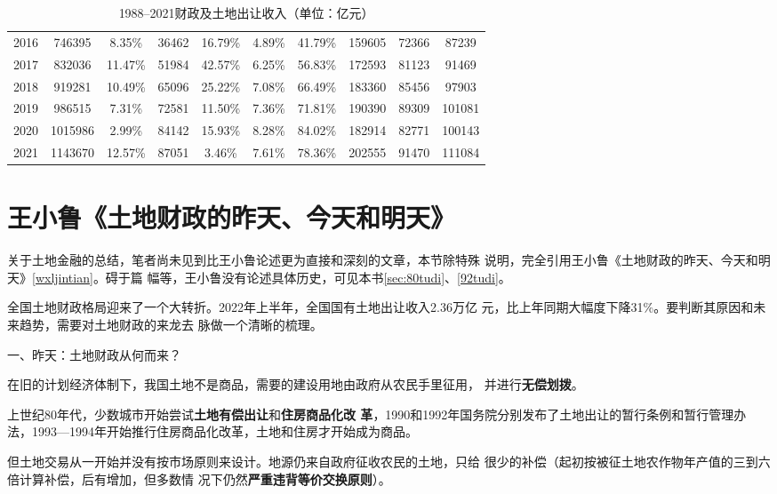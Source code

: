 \begin{table}[h]
{\begin{tabular}{@{}cccccccccc@{}}
2016 & 746395  & 8.35\%  & 36462 & 16.79\%   & 4.89\% & 41.79\% & 159605 & 72366 & 87239  \\
2017 & 832036  & 11.47\% & 51984 & 42.57\%   & 6.25\% & 56.83\% & 172593 & 81123 & 91469  \\
2018 & 919281  & 10.49\% & 65096 & 25.22\%   & 7.08\% & 66.49\% & 183360 & 85456 & 97903  \\
2019 & 986515  & 7.31\%  & 72581 & 11.50\%   & 7.36\% & 71.81\% & 190390 & 89309 & 101081 \\
2020 & 1015986 & 2.99\%  & 84142 & 15.93\%   & 8.28\% & 84.02\% & 182914 & 82771 & 100143 \\
2021 & 1143670 & 12.57\% & 87051 & 3.46\%    & 7.61\% & 78.36\% & 202555 & 91470 & 111084 \\ \bottomrule
\end{tabular}%
}
\caption{1988--2021财政及土地出让收入（单位：亿元）}
\label{tab:19882021}
\end{table}

\section{王小鲁《土地财政的昨天、今天和明天》}

关于土地金融的总结，笔者尚未见到比王小鲁论述更为直接和深刻的文章，本节除特殊
说明，完全引用王小鲁《土地财政的昨天、今天和明天》\cref{wxljintian}。碍于篇
幅等，王小鲁没有论述具体历史，可见本书\cref{sec:80tudi}、\cref{92tudi}。

全国土地财政格局迎来了一个大转折。2022年上半年，全国国有土地出让收入2.36万亿
元，比上年同期大幅度下降31\%。要判断其原因和未来趋势，需要对土地财政的来龙去
脉做一个清晰的梳理。

{\heiti 一、昨天：土地财政从何而来？}

在旧的计划经济体制下，我国土地不是商品，需要的建设用地由政府从农民手里征用，
并进行\textbf{无偿划拨}。

上世纪80年代，少数城市开始尝试\textbf{土地有偿出让}和\textbf{住房商品化改
  革}，1990和1992年国务院分别发布了土地出让的暂行条例和暂行管理办
法，1993—1994年开始推行住房商品化改革，土地和住房才开始成为商品。

但土地交易从一开始并没有按市场原则来设计。地源仍来自政府征收农民的土地，只给
很少的补偿（起初按被征土地农作物年产值的三到六倍计算补偿，后有增加，但多数情
况下仍然\textbf{严重违背等价交换原则}）。

